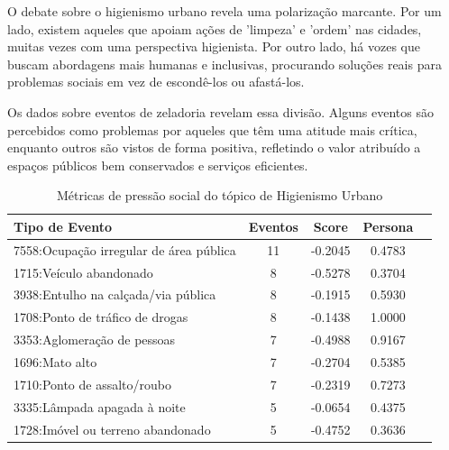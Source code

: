 O debate sobre o higienismo urbano revela uma polarização marcante. Por um lado, existem aqueles que apoiam ações de 'limpeza' e 'ordem' nas cidades, muitas vezes com uma perspectiva higienista. Por outro lado, há vozes que buscam abordagens mais humanas e inclusivas, procurando soluções reais para problemas sociais em vez de escondê-los ou afastá-los.

Os dados sobre eventos de zeladoria revelam essa divisão. Alguns eventos são percebidos como problemas por aqueles que têm uma atitude mais crítica, enquanto outros são vistos de forma positiva, refletindo o valor atribuído a espaços públicos bem conservados e serviços eficientes.

\begin{table}[htbp]
	\centering
	\caption{Métricas de pressão social do tópico de Higienismo Urbano}
	\label{tab:eventos_populares_homeland}
	\begin{tabular}{|l|c|c|c|c|}
		\hline
		\textbf{Tipo de Evento}                               & \textbf{Eventos} & \textbf{Score} & \textbf{Persona} \\
		\hline
		7558:Ocupação irregular de área pública               & 11               & -0.2045        & 0.4783           \\
		\hline
		1715:Veículo abandonado                               & 8                & -0.5278        & 0.3704           \\
		\hline
		3938:Entulho na calçada/via pública                   & 8                & -0.1915        & 0.5930           \\
		\hline
		1708:Ponto de tráfico de drogas                       & 8                & -0.1438        & 1.0000           \\
		\hline
		3353:Aglomeração de pessoas                           & 7                & -0.4988        & 0.9167           \\
		\hline
		1696:Mato alto                                        & 7                & -0.2704        & 0.5385           \\
		\hline
		1710:Ponto de assalto/roubo                           & 7                & -0.2319        & 0.7273           \\
		\hline
		3335:Lâmpada apagada à noite                          & 5                & -0.0654        & 0.4375           \\
		\hline
		1728:Imóvel ou terreno abandonado                     & 5                & -0.4752        & 0.3636           \\

\end{tabular}
\end{table}
